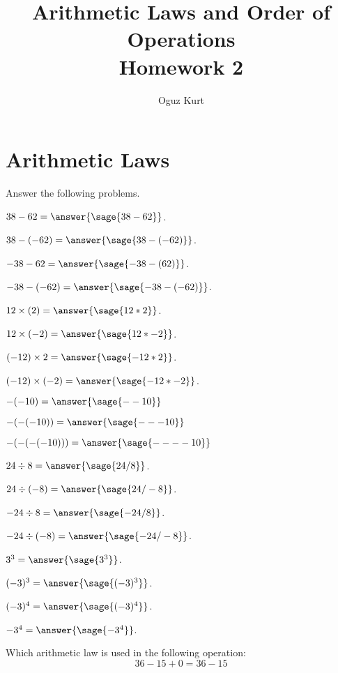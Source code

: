 \documentclass{ximera}
\title{Arithmetic Laws and Order of Operations \\ Homework 2}
\author{Oguz Kurt}
\begin{document}
\maketitle


\section*{Arithmetic Laws}
\begin{problem} Answer the following problems.

$38 - 62 =\answer{\sage{38-62}}$.

$38 - (-62) =\answer{\sage{38-(-62)}}$.

$-38 - 62 =\answer{\sage{-38-(62)}}$.

$-38 - (-62) =\answer{\sage{-38-(-62)}}$.

$12\times (2)=\answer{\sage{12*2}}$.

$12\times (-2)=\answer{\sage{12*-2}}$.

$(-12)\times 2=\answer{\sage{-12*2}}$.

$(-12)\times (-2)=\answer{\sage{-12*-2}}$.

$-(-10)=\answer{\sage{--10}}$

$-(-(-10))=\answer{\sage{---10}}$

$-(-(-(-10)))=\answer{\sage{----10}}$

$24\div 8=\answer{\sage{24/8}}$.

$24\div (-8)=\answer{\sage{24/-8}}$.

$-24\div 8=\answer{\sage{-24/8}}$.

$-24\div (-8)=\answer{\sage{-24/-8}}$.

$3^3=\answer{\sage{3^3}}$.

$(-3)^3=\answer{\sage{(-3)^3}}$.

$(-3)^4=\answer{\sage{(-3)^4}}$.

$-3^4=\answer{\sage{-3^4}}$.

\end{problem}

\begin{problem}
Which arithmetic law is used in the following operation:
$$36-15+0=36-15$$

\begin{multipleChoice}
\end{multipleChoice}
\end{problem}
\end{document}
